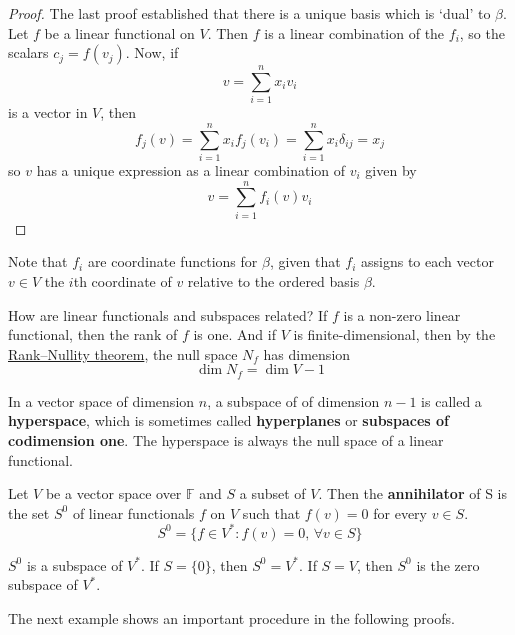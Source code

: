 \begin{proof}
	The last proof established that there is a unique basis which is `dual' to $\beta$. Let $f$ be a linear functional on $V$. Then $f$ is a linear combination of the $f_i$, so the scalars $c_j = f(v_j)$. Now, if
	\[
		v = \sum_{i=1}^n x_i v_i
	\]
	is a vector in $V$, then
	\[
		f_j(v) = \sum_{i=1}^n x_i f_j(v_i) = \sum_{i=1}^n x_i \delta_{ij} = x_j
	\]
	so $v$ has a unique expression as a linear combination of $v_i$ given by
	\[
		v = \sum_{i=1}^n f_i(v) v_i
	\]
\end{proof}

Note that $f_i$ are coordinate functions for $\beta$, given that $f_i$ assigns to each vector $v \in V$ the $i$th coordinate of $v$ relative to the ordered basis $\beta$.

How are linear functionals and subspaces related? If $f$ is a non-zero linear functional, then the rank of $f$ is one. And if $V$ is finite-dimensional, then by the \hyperref[thm:rank-null]{Rank–Nullity theorem}, the null space $N_f$ has dimension
\[
	\dim N_f = \dim V - 1
\]

In a vector space of dimension $n$, a subspace of of dimension $n-1$ is called a \textbf{hyperspace}, which is sometimes called \textbf{hyperplanes} or \textbf{subspaces of codimension one}. The hyperspace is always the null space of a linear functional.

\begin{definition}[Annihilator]
	Let $V$ be a vector space over $\mathbb{F}$ and $S$ a subset of $V$. Then the \textbf{annihilator} of S is the set $S^0$ of linear functionals $f$ on $V$ such that $f(v) = 0$ for every $v \in S$.
	\[
		S^0 = \{ f \in V^\ast : f(v) = 0, \, \forall v \in S \}
	\]
\end{definition}

$S^0$ is a subspace of $V^\ast$. If $S = \{ 0 \}$, then $S^0 = V^\ast$. If $S = V$, then $S^0$ is the zero subspace of $V^\ast$.

The next example shows an important procedure in the following proofs.


